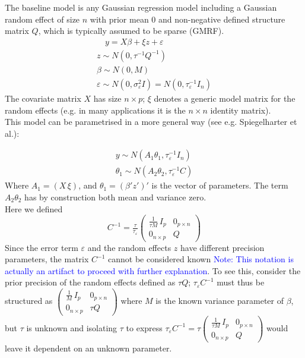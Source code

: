 \documentclass{article}
\begin{document}
The baseline model is any Gaussian regression model including a Gaussian random effect of size $n$ with prior mean $0$ and non-negative defined structure matrix $Q$, which is typically assumed to be sparse (GMRF).
\begin{equation}
\begin{aligned}
\quad y = X \beta + \xi z + \varepsilon \\
z \sim N (0, \tau^{-1} Q^{-1}) \\
\beta \sim N(0, M)\\
\varepsilon \sim N(0, \sigma_{\varepsilon}^2 I)= N(0, \tau_{\varepsilon}^{-1}I_n)
\end{aligned}
\end{equation}
The covariate matrix $X$ has size $n \times p$; $\xi$ denotes a generic model matrix for the random effects (e.g. in many applications it is the $n \times n$ identity matrix).\\ This model can be parametrised in a more general way (see e.g. Spiegelharter et al.):

\begin{equation}
\begin{aligned}
y \sim N(A_1 \theta_1,\tau_{\varepsilon}^{-1} I_n ) \\
\theta_1 \sim N(A_2  \theta_2,\tau_{\varepsilon}^{-1} C)
\end{aligned}
\end{equation}
Where  $A_1 = (X \, \xi)$, and $\theta_1 = (\beta' z')'$ is the vector of parameters. The term $A_2 \theta_2$ has by construction both mean and variance zero.\\
Here we defined
$$ C^{-1} = \tfrac{\tau}{\tau_{\varepsilon}} \begin{pmatrix}
 \frac{1}{\tau M} \, I_p & 0_{p \times n} \\ 0_{n \times p} & Q
\end{pmatrix}$$
Since the error term $\varepsilon$ and the random effects $z$ have different precision parameters, the matrix $C^{-1}$ cannot be considered known \textcolor{blue}{Note: This notation is actually an artifact to proceed with further explanation}. To see this, consider the prior precision of the random effects defined as $\tau Q$; $\tau_{\varepsilon} C^{-1}$ must thus be structured as $\begin{pmatrix} \frac{1}{M} \, I_p & 0_{p \times n} \\ 0_{n \times p} & \tau Q \end{pmatrix}$ where $M$ is the known variance parameter of $\beta$, but $\tau$ is unknown and isolating $\tau$ to express $\tau_{\varepsilon} C^{-1} = \tau \begin{pmatrix}
 \frac{1}{\tau M} \, I_p & 0_{p \times n} \\ 0_{n \times p} & Q
\end{pmatrix}$ would leave it dependent on an unknown parameter. \\
\end{document}
